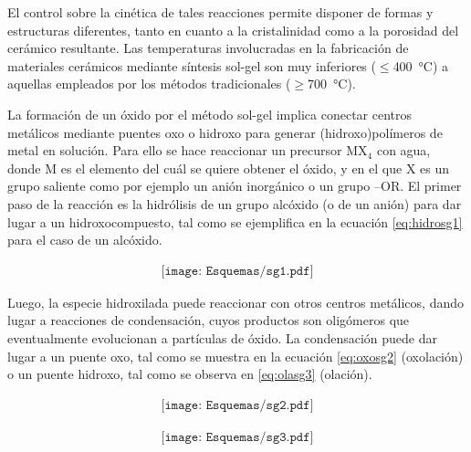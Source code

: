 	 El control sobre la cinética de tales reacciones permite disponer de formas y estructuras diferentes, tanto en cuanto a la cristalinidad como a la porosidad del cerámico resultante. Las temperaturas involucradas en la fabricación de materiales cerámicos mediante síntesis sol-gel son muy inferiores ($\leq$\SI{400}{\celsius}) a aquellas empleados por  los métodos tradicionales ($\geq$\SI{700}{\celsius}).\cite{Brinker1990,Jolivet2000,Wright2001}

	 La formación de un óxido por el método sol-gel implica conectar centros metálicos mediante puentes oxo o hidroxo para generar (hidroxo)polímeros de metal en solución. Para ello se hace reaccionar un precursor MX$_4$ con agua, donde M es el elemento del cuál se quiere obtener el óxido, y en el que X es un grupo saliente como por ejemplo un anión inorgánico o un grupo –OR. El primer paso de la reacción es la hidrólisis de un grupo alcóxido (o de un anión) para dar lugar a un hidroxocompuesto, tal como se ejemplifica en la ecuación \ref{eq:hidrosg1} para el caso de un alcóxido.
			
			 \begin{equation}
 				\begin{aligned}
 				\texttt{[image: Esquemas/sg1.pdf]}
 				\end{aligned}
 				\label{eq:hidrosg1}
 	 			\end{equation}

    	Luego, la especie hidroxilada puede reaccionar con otros centros metálicos, dando lugar a reacciones de condensación, cuyos productos son oligómeros que eventualmente evolucionan a partículas de óxido. La condensación puede dar lugar a un puente oxo, tal como se muestra en la ecuación \ref{eq:oxosg2} (oxolación) o un puente hidroxo, tal como se observa en \ref{eq:olasg3} (olación). 

			\begin{equation}
		    	\begin{aligned}
 	 	 		\texttt{[image: Esquemas/sg2.pdf]}
 	 	 		\end{aligned}
 	 	 		\label{eq:oxosg2}
 	 	 		\end{equation}

			\begin{equation}
 	 	 		\begin{aligned}
 	 	 		\texttt{[image: Esquemas/sg3.pdf]}
 	 	 		\label{eq:olasg3}
 	 	 		\end{aligned}
 	 	 		\end{equation}

